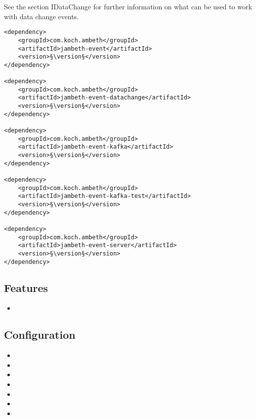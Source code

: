 See the section IDataChange for further information on what can be used to work with data change events.


\begin{lstlisting}[style=POM,caption={Maven modules to use \emph{Ambeth Event}}]
<dependency>
	<groupId>com.koch.ambeth</groupId>
	<artifactId>jambeth-event</artifactId>
	<version>§\version§</version>
</dependency>

<dependency>
	<groupId>com.koch.ambeth</groupId>
	<artifactId>jambeth-event-datachange</artifactId>
	<version>§\version§</version>
</dependency>

<dependency>
	<groupId>com.koch.ambeth</groupId>
	<artifactId>jambeth-event-kafka</artifactId>
	<version>§\version§</version>
</dependency>

<dependency>
	<groupId>com.koch.ambeth</groupId>
	<artifactId>jambeth-event-kafka-test</artifactId>
	<version>§\version§</version>
</dependency>

<dependency>
	<groupId>com.koch.ambeth</groupId>
	<artifactId>jambeth-event-server</artifactId>
	<version>§\version§</version>
</dependency>
\end{lstlisting}
\subsection{Features}
\begin{itemize}
	\item {}
\end{itemize}

\subsection{Configuration}
\begin{itemize}
	\item {}
	\item {}
	\item {}
	\item {}
	\item {}
	\item {}
	\item {}
\end{itemize}

